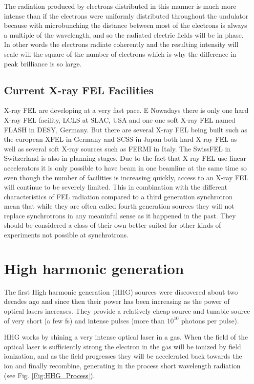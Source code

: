 The radiation produced by electrons distributed in this manner is much more
intense than if the electrons were uniformly distributed throughout the
undulator because with microbunching the distance between most of the electrons is
always a multiple of the wavelength, and so the radiated electric fields will be
in phase. In other words the electrons radiate coherently and the resulting
intensity will scale will the square of the number of electrons which is why the
difference in peak brilliance is so large.

\subsection{Current X-ray FEL Facilities}

X-ray FEL are developing at a very fast pace. E
Nowadays there is only one hard X-ray FEL facility, LCLS at SLAC, USA and one
one soft X-ray FEL named FLASH in DESY, Germany. But there are several X-ray FEL
being built such as the european XFEL in Germany and SCSS
in Japan both hard X-ray FEL as well as several soft X-ray sources such as FERMI
in Italy. The SwissFEL in Switzerland is also in planning stages. 
Due to the fact that X-ray FEL use linear accelerators it is only
possible to have beam in one beamline at the same time so even though the number
of facilities is increasing quickly, access to an X-ray FEL will continue to be
severely limited. This in combination with the different characteristics of FEL
radiation compared to a third generation synchrotron mean that while they are
often called fourth generation sources they will not replace synchrotrons in any
meaninful sense as it happened in the past. They should be considered a class of
their own better suited for other kinds of experiments not possible at synchrotrons.

\section{High harmonic generation}

The first High harmonic generation (HHG) sources were discovered about two decades ago
and since then their power has been increasing as the power of optical lasers
increases. They provide a relatively cheap source and tunable source of very
short (a few fs) and intense pulses (more than $10^{10}$ photons per pulse). 

HHG works by shining a very intense optical laser in a gas. When the field of
the optical laser is sufficiently strong the electron in the gas will be ionized
by field ionization, and as the field progresses they will be accelerated back
towards the ion and finally recombine, generating in the process short
wavelength radiation (see Fig. \ref{Fig:HHG_Process}).

